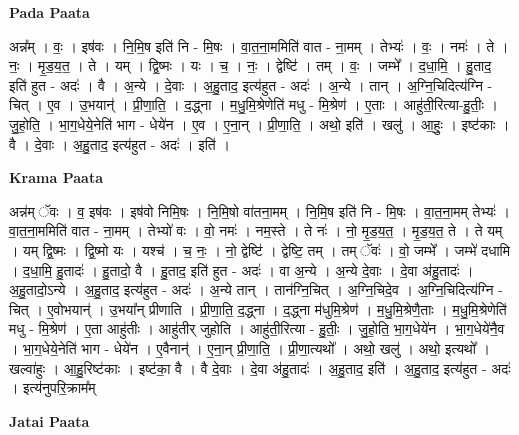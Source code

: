 \documentclass[17pt]{extarticle}
\begin{document}
\textbf{Pada Paata} \newline

अन्न᳚म् । वः॒ । इष॑वः । नि॒मि॒ष इति॑ नि - मि॒षः । वा॒त॒ना॒ममिति॑ वात - ना॒मम् । तेभ्यः॑ । वः॒ । नमः॑ । ते । नः॒ । मृ॒ड॒य॒त॒ । ते । यम् । द्वि॒ष्मः । यः । च॒ । नः॒ । द्वेष्टि॑ । तम् । वः॒ । जम्भे᳚ । द॒धा॒मि॒ । हु॒ताद॒ इति॑ हुत - अदः॑ । वै । अ॒न्ये । दे॒वाः । अ॒हु॒ताद॒ इत्य॑हुत - अदः॑ । अ॒न्ये । तान् । अ॒ग्नि॒चिदित्य॑ग्नि - चित् । ए॒व । उ॒भयान्॑ । प्री॒णा॒ति॒ । द॒द्ध्ना । म॒धु॒मि॒श्रेणेति॑ मधु - मि॒श्रेण॑ । ए॒ताः । आहु॑ती॒रित्या-हु॒तीः॒ । जु॒हो॒ति॒ । भा॒ग॒धेये॒नेति॑ भाग - धेये॑न । ए॒व । ए॒ना॒न् । प्री॒णा॒ति॒ । अथो॒ इति॑ । खलु॑ । आ॒हुः॒ । इष्ट॑काः । वै । दे॒वाः । अ॒हु॒ताद॒ इत्य॑हुत - अदः॑ । इति॑ ।  \newline


\textbf{Krama Paata} \newline

अन्न॑म् ॅवः । व॒ इष॑वः । इष॑वो निमि॒षः । नि॒मि॒षो वा॑तना॒मम् । नि॒मि॒ष इति॑ नि - मि॒षः । वा॒त॒ना॒मम् तेभ्यः॑ । वा॒त॒ना॒ममिति॑ वात - ना॒मम् । तेभ्यो॑ वः । वो॒ नमः॑ । नम॒स्ते । ते नः॑ । नो॒ मृ॒ड॒य॒त॒ । मृ॒ड॒य॒त॒ ते । ते यम् । यम् द्वि॒ष्मः । द्वि॒ष्मो यः । यश्च॑ । च॒ नः॒ । नो॒ द्वेष्टि॑ । द्वेष्टि॒ तम् । तम् ॅवः॑ । वो॒ जम्भे᳚ । जम्भे॑ दधामि । द॒धा॒मि॒ हु॒तादः॑ । हु॒तादो॒ वै । हु॒ताद॒ इति॑ हुत - अदः॑ । वा अ॒न्ये । अ॒न्ये दे॒वाः । दे॒वा अ॑हु॒तादः॑ । अ॒हु॒तादो॒ऽन्ये । अ॒हु॒ताद॒ इत्य॑हुत - अदः॑ । अ॒न्ये तान् । तान॑ग्नि॒चित् । अ॒ग्नि॒चिदे॒व । अ॒ग्नि॒चिदित्य॑ग्नि - चित् । ए॒वोभयान्॑ । उ॒भया᳚न् प्रीणाति । प्री॒णा॒ति॒ द॒द्ध्ना । द॒द्ध्ना म॑धुमि॒श्रेण॑ । म॒धु॒मि॒श्रेणै॒ताः । म॒धु॒मि॒श्रेणेति॑ मधु - मि॒श्रेण॑ । ए॒ता आहु॑तीः । आहु॑तीर् जुहोति । आहु॑ती॒रित्या - हु॒तीः॒ । जु॒हो॒ति॒ भा॒ग॒धेये॑न । भा॒ग॒धेये॑नै॒व । भा॒ग॒धेये॒नेति॑ भाग - धेये॑न । ए॒वैनान्॑ । ए॒ना॒न् प्री॒णा॒ति॒ । प्री॒णा॒त्यथो᳚ । अथो॒ खलु॑ । अथो॒ इत्यथो᳚ । खल्वा॑हुः । आ॒हु॒रिष्ट॑काः । इष्ट॑का॒ वै । वै दे॒वाः । दे॒वा अ॑हु॒तादः॑ । अ॒हु॒ताद॒ इति॑ । अ॒हु॒ताद॒ इत्य॑हुत - अदः॑ । इत्य॑नुपरि॒क्राम᳚म् \newline

\textbf{Jatai Paata} \newline
\end{document}
